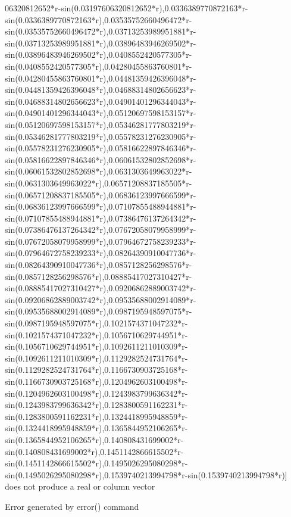 \documentclass[a4paper,10pt]{article}
\begin{document}
\begin{eulernotebook}
\begin{eulercomment}
\begin{eulercomment}
\begin{eulercomment}
\begin{eulercomment}
\begin{eulercomment}
\begin{eulercomment}
\begin{eulercomment}
\begin{eulercomment}
\begin{eulercomment}
\begin{eulercomment}
\begin{eulercomment}
\begin{eulercomment}
\begin{eulercomment}
\begin{eulercomment}
\begin{eulercomment}
\begin{eulercomment}
\begin{eulercomment}
\begin{eulercomment}
\begin{eulercomment}
\begin{eulercomment}
\begin{euleroutput}
06320812652*r-sin(0.03197606320812652*r),0.0336389770872163*r-sin(0.0336389770872163*r),0.03535752660496472*r-sin(0.03535752660496472*r),0.03713253989951881*r-sin(0.03713253989951881*r),0.03896483946269502*r-sin(0.03896483946269502*r),0.0408552420577305*r-sin(0.0408552420577305*r),0.04280455863760801*r-sin(0.04280455863760801*r),0.04481359426396048*r-sin(0.04481359426396048*r),0.04688314802656623*r-sin(0.04688314802656623*r),0.04901401296344043*r-sin(0.04901401296344043*r),0.05120697598153157*r-sin(0.05120697598153157*r),0.05346281777803219*r-sin(0.05346281777803219*r),0.05578231276230905*r-sin(0.05578231276230905*r),0.05816622897846346*r-sin(0.05816622897846346*r),0.06061532802852698*r-sin(0.06061532802852698*r),0.0631303649963022*r-sin(0.0631303649963022*r),0.06571208837185505*r-sin(0.06571208837185505*r),0.06836123997666599*r-sin(0.06836123997666599*r),0.07107855488944881*r-sin(0.07107855488944881*r),0.07386476137264342*r-sin(0.07386476137264342*r),0.07672058079958999*r-sin(0.07672058079958999*r),0.07964672758239233*r-sin(0.07964672758239233*r),0.08264390910047736*r-sin(0.08264390910047736*r),0.0857128256298576*r-sin(0.0857128256298576*r),0.08885417027310427*r-sin(0.08885417027310427*r),0.09206862889003742*r-sin(0.09206862889003742*r),0.09535688002914089*r-sin(0.09535688002914089*r),0.0987195948597075*r-sin(0.0987195948597075*r),0.1021574371047232*r-sin(0.1021574371047232*r),0.1056710629744951*r-sin(0.1056710629744951*r),0.1092611211010309*r-sin(0.1092611211010309*r),0.1129282524731764*r-sin(0.1129282524731764*r),0.1166730903725168*r-sin(0.1166730903725168*r),0.1204962603100498*r-sin(0.1204962603100498*r),0.1243983799636342*r-sin(0.1243983799636342*r),0.1283800591162231*r-sin(0.1283800591162231*r),0.1324418995948859*r-sin(0.1324418995948859*r),0.1365844952106265*r-sin(0.1365844952106265*r),0.140808431699002*r-sin(0.140808431699002*r),0.1451142866615502*r-sin(0.1451142866615502*r),0.1495026295080298*r-sin(0.1495026295080298*r),0.1539740213994798*r-sin(0.1539740213994798*r)] does not produce a real or column vector
  
  Error generated by error() command
  

\end{euleroutput}
\end{eulercomment}
\end{eulercomment}
\end{eulercomment}
\end{eulercomment}
\end{eulercomment}
\end{eulercomment}
\end{eulercomment}
\end{eulercomment}
\end{eulercomment}
\end{eulercomment}
\end{eulercomment}
\end{eulercomment}
\end{eulercomment}
\end{eulercomment}
\end{eulercomment}
\end{eulercomment}
\end{eulercomment}
\end{eulercomment}
\end{eulercomment}
\end{eulercomment}
\end{eulernotebook}
\end{document}
